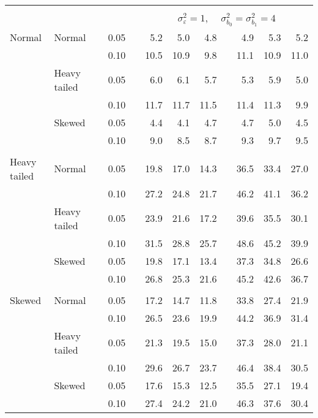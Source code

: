 \begin{table}[ht]
\begin{scriptsize}
\begin{center}
\begin{tabular}{ll p{.1cm} c p{.1cm} rrr p{.1cm} rrr}
&&&&&&&&&&&\\
& && && \multicolumn{7}{c}{$\sigma_{\varepsilon}^2 = 1$, \ \ $\sigma_{b_0}^2 = \sigma_{b_1}^2 = 4$} \\ \cline{6-12}
\rowcolor{gray!20}Normal       & Normal       && 0.05 &&   5.2 & 5.0 & 4.8 &   & 4.9 & 5.3 & 5.2 \\ 
\rowcolor{gray!20}             &              && 0.10 &&   10.5 & 10.9 & 9.8 &   & 11.1 & 10.9 & 11.0 \\ 
\rowcolor{gray!20}             & Heavy tailed && 0.05 &&   6.0 & 6.1 & 5.7 &   & 5.3 & 5.9 & 5.0 \\ 
\rowcolor{gray!20}             &              && 0.10 &&   11.7 & 11.7 & 11.5 &   & 11.4 & 11.3 & 9.9 \\ 
\rowcolor{gray!20}             & Skewed       && 0.05 &&   4.4 & 4.1 & 4.7 &   & 4.7 & 5.0 & 4.5 \\ 
\rowcolor{gray!20}             &              && 0.10 &&   9.0 & 8.5 & 8.7 &   & 9.3 & 9.7 & 9.5 \\ 
&&&&&&&&&&&\\
Heavy tailed & Normal       && 0.05 &&   19.8 & 17.0 & 14.3 &   & 36.5 & 33.4 & 27.0 \\ 
             &              && 0.10 &&   27.2 & 24.8 & 21.7 &   & 46.2 & 41.1 & 36.2 \\ 
             & Heavy tailed && 0.05 &&   23.9 & 21.6 & 17.2 &   & 39.6 & 35.5 & 30.1 \\ 
             &              && 0.10 &&   31.5 & 28.8 & 25.7 &   & 48.6 & 45.2 & 39.9 \\ 
             & Skewed       && 0.05 &&   19.8 & 17.1 & 13.4 &   & 37.3 & 34.8 & 26.6 \\ 
             &              && 0.10 &&   26.8 & 25.3 & 21.6 &   & 45.2 & 42.6 & 36.7 \\ 
&&&&&&&&&&&\\
Skewed       & Normal       && 0.05 &&   17.2 & 14.7 & 11.8 &   & 33.8 & 27.4 & 21.9 \\ 
             &              && 0.10 &&   26.5 & 23.6 & 19.9 &   & 44.2 & 36.9 & 31.4 \\ 
             & Heavy tailed && 0.05 &&   21.3 & 19.5 & 15.0 &   & 37.3 & 28.0 & 21.1 \\ 
             &              && 0.10 &&   29.6 & 26.7 & 23.7 &   & 46.4 & 38.4 & 30.5 \\ 
             & Skewed       && 0.05 &&   17.6 & 15.3 & 12.5 &   & 35.5 & 27.1 & 19.4 \\ 
             &              && 0.10 &&   27.4 & 24.2 & 21.0 &   & 46.3 & 37.6 & 30.4 \\ 

\hline
\end{tabular}
\end{center}
\end{scriptsize}
\end{table}

